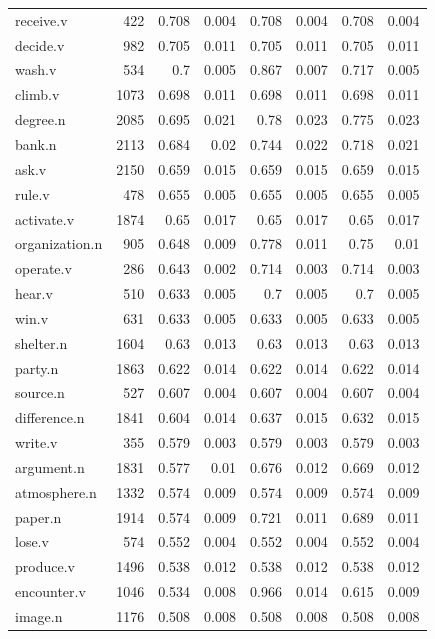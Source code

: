 \documentclass{article}
\begin{document}
\begin{longtable}{l | r r r r r r r}
receive.v	&	422	&	0.708	&	0.004	&	0.708	&	0.004	&	0.708	&	0.004\\
decide.v	&	982	&	0.705	&	0.011	&	0.705	&	0.011	&	0.705	&	0.011\\
wash.v	&	534	&	0.7	&	0.005	&	0.867	&	0.007	&	0.717	&	0.005\\
climb.v	&	1073	&	0.698	&	0.011	&	0.698	&	0.011	&	0.698	&	0.011\\
degree.n	&	2085	&	0.695	&	0.021	&	0.78	&	0.023	&	0.775	&	0.023\\
bank.n	&	2113	&	0.684	&	0.02	&	0.744	&	0.022	&	0.718	&	0.021\\
ask.v	&	2150	&	0.659	&	0.015	&	0.659	&	0.015	&	0.659	&	0.015\\
rule.v	&	478	&	0.655	&	0.005	&	0.655	&	0.005	&	0.655	&	0.005\\
activate.v	&	1874	&	0.65	&	0.017	&	0.65	&	0.017	&	0.65	&	0.017\\
organization.n	&	905	&	0.648	&	0.009	&	0.778	&	0.011	&	0.75	&	0.01\\
operate.v	&	286	&	0.643	&	0.002	&	0.714	&	0.003	&	0.714	&	0.003\\
hear.v	&	510	&	0.633	&	0.005	&	0.7	&	0.005	&	0.7	&	0.005\\
win.v	&	631	&	0.633	&	0.005	&	0.633	&	0.005	&	0.633	&	0.005\\
shelter.n	&	1604	&	0.63	&	0.013	&	0.63	&	0.013	&	0.63	&	0.013\\
party.n	&	1863	&	0.622	&	0.014	&	0.622	&	0.014	&	0.622	&	0.014\\
source.n	&	527	&	0.607	&	0.004	&	0.607	&	0.004	&	0.607	&	0.004\\
difference.n	&	1841	&	0.604	&	0.014	&	0.637	&	0.015	&	0.632	&	0.015\\
write.v	&	355	&	0.579	&	0.003	&	0.579	&	0.003	&	0.579	&	0.003\\
argument.n	&	1831	&	0.577	&	0.01	&	0.676	&	0.012	&	0.669	&	0.012\\
atmosphere.n	&	1332	&	0.574	&	0.009	&	0.574	&	0.009	&	0.574	&	0.009\\
paper.n	&	1914	&	0.574	&	0.009	&	0.721	&	0.011	&	0.689	&	0.011\\
lose.v	&	574	&	0.552	&	0.004	&	0.552	&	0.004	&	0.552	&	0.004\\
produce.v	&	1496	&	0.538	&	0.012	&	0.538	&	0.012	&	0.538	&	0.012\\
encounter.v	&	1046	&	0.534	&	0.008	&	0.966	&	0.014	&	0.615	&	0.009\\
image.n	&	1176	&	0.508	&	0.008	&	0.508	&	0.008	&	0.508	&	0.008\\

\end{longtable}
\end{document}
